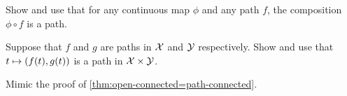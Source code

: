 \begin{multicols}{2}

Show and use that for any continuous map $\phi$ and any path $f$, the composition $\phi\circ f$ is a path. 

Suppose that $f$ and $g$ are paths in $\mathcal{X}$ and $\mathcal{Y}$ respectively.
Show and use that $t\z\mapsto (f(t),g(t))$ is a path in $\mathcal{X}\times\mathcal{Y}$.

 Mimic the proof of \ref{thm:open-connected=path-connected}.


\end{multicols}
